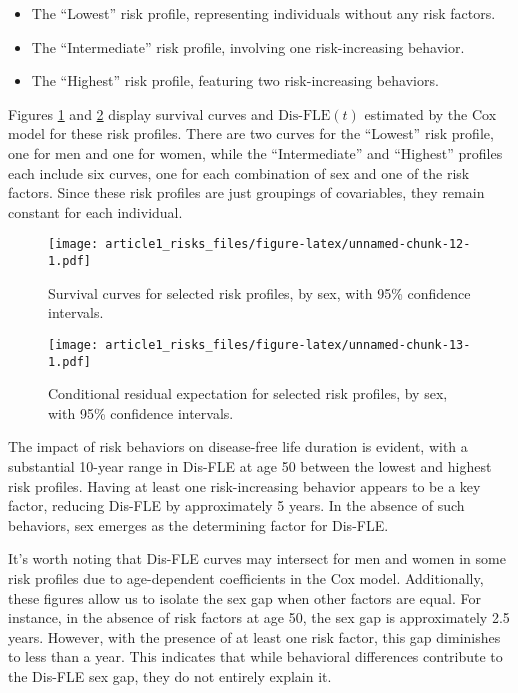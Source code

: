 \documentclass[risks,article,submit,moreauthors,pdftex]{Definitions/mdpi}
\providecommand{\tightlist}{%
  \setlength{\itemsep}{0pt}\setlength{\parskip}{0pt}}
\begin{document}
\begin{itemize}
\tightlist
\item
  The ``Lowest'' risk profile, representing individuals without any risk
  factors.
\item
  The ``Intermediate'' risk profile, involving one risk-increasing
  behavior.
\item
  The ``Highest'' risk profile, featuring two risk-increasing behaviors.
\end{itemize}

Figures \ref{fig:cox_f3_profile_surv_curves} and
\ref{fig:cox_f3_profile_surv_time_curves} display survival curves and
\(\text{Dis-FLE}(t)\) estimated by the Cox model for these risk
profiles. There are two curves for the ``Lowest'' risk profile, one for
men and one for women, while the ``Intermediate'' and ``Highest''
profiles each include six curves, one for each combination of sex and
one of the risk factors. Since these risk profiles are just groupings of
covariables, they remain constant for each individual.

\begin{figure}
\centering
\texttt{[image: article1\_risks\_files/figure-latex/unnamed-chunk-12-1.pdf]}
\caption{\label{fig:cox_f3_profile_surv_curves} Survival curves for
selected risk profiles, by sex, with 95\% confidence intervals.}
\end{figure}

\begin{figure}
\centering
\texttt{[image: article1\_risks\_files/figure-latex/unnamed-chunk-13-1.pdf]}
\caption{\label{fig:cox_f3_profile_surv_time_curves} Conditional
residual expectation for selected risk profiles, by sex, with 95\%
confidence intervals.}
\end{figure}

The impact of risk behaviors on disease-free life duration is evident,
with a substantial 10-year range in Dis-FLE at age 50 between the lowest
and highest risk profiles. Having at least one risk-increasing behavior
appears to be a key factor, reducing Dis-FLE by approximately 5 years.
In the absence of such behaviors, sex emerges as the determining factor
for Dis-FLE.

It's worth noting that Dis-FLE curves may intersect for men and women in
some risk profiles due to age-dependent coefficients in the Cox model.
Additionally, these figures allow us to isolate the sex gap when other
factors are equal. For instance, in the absence of risk factors at age
50, the sex gap is approximately 2.5 years. However, with the presence
of at least one risk factor, this gap diminishes to less than a year.
This indicates that while behavioral differences contribute to the
Dis-FLE sex gap, they do not entirely explain it.
\end{document}
